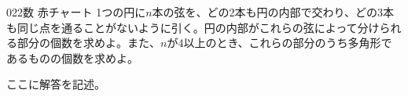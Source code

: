 \begin{thm}{022}{}{数 赤チャート}
 1つの円に$n$本の弦を、どの2本も円の内部で交わり、どの3本も同じ点を通ることがないように引く。円の内部がこれらの弦によって分けられる部分の個数を求めよ。また、$n$が4以上のとき、これらの部分のうち多角形であるものの個数を求めよ。
\end{thm}

ここに解答を記述。
